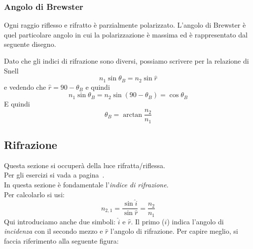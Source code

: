 \subsubsection{Angolo di Brewster}
Ogni raggio riflesso e rifratto è parzialmente polarizzato. L'angolo di Brewster è quel particolare
angolo in cui la polarizzazione è massima ed è rappresentato dal seguente disegno.
\begin{center}
\end{center}
Dato che gli indici di rifrazione sono diversi, possiamo scrivere per la relazione di Snell
\begin{equation*}
  n_1\sin\theta_B = n_2\sin\hat{r}
\end{equation*}
e vedendo che $\hat{r} = 90-\theta_B$ e quindi
\begin{equation*}
  n_1\sin\theta_B = n_2\sin(90-\theta_B) = \cos\theta_B
\end{equation*}
E quindi
\begin{equation*}
  \theta_B = \arctan\frac{n_2}{n_1}
\end{equation*}

\subsection{Rifrazione}\label{subsec:onde:rifrazione}
Questa sezione si occuperà della luce rifratta/riflessa.\\
Per gli esercizi si vada a pagina~\pageref{ex:rifrazione}.\\ [\baselineskip]
In questa sezione è fondamentale l'\emph{indice di rifrazione}.\\
Per calcolarlo si usi:
\begin{equation*}
  n_{2,1} = \frac{\sin\hat{i}}{\sin\hat{r}} = \frac{n_2}{n_1}
\end{equation*}
Qui introduciamo anche due simboli: $\hat{i}$ e $\hat{r}$. Il primo ($\hat{i}$) indica l'angolo di
\emph{incidenza} con il secondo mezzo e $\hat{r}$ l'angolo di rifrazione. Per capire meglio, si
faccia riferimento alla seguente figura:

